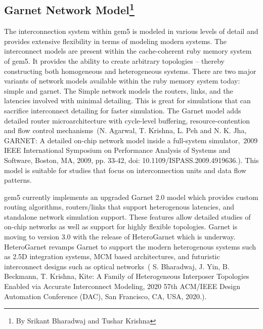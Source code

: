 \subsection[Garnet Network Model]{Garnet Network Model\footnote{By Srikant Bharadwaj and Tushar Krishna}}

The interconnection system within gem5 is modeled in various levels of detail and provides extensive
flexibility in terms of modeling modern systems.
The interconnect models are present within the cache-coherent ruby memory system of gem5.
It provides the ability to create arbitrary topologies – thereby constructing both homogeneous and heterogeneous systems.
There are two major variants of network models available within the ruby memory system today: simple and garnet.
The Simple network models the routers, links, and the latencies involved with minimal detailing.
This is great for simulations that can sacrifice interconnect detailing for faster simulation.
The Garnet model adds detailed router microarchitecture with cycle-level buffering, resource-contention and flow control mechanisms~\cite{}(N. Agarwal, T. Krishna, L. Peh and N. K. Jha, GARNET: A detailed on-chip network model inside a full-system simulator, 2009 IEEE International Symposium on Performance Analysis of Systems and Software, Boston, MA, 2009, pp. 33-42, doi: 10.1109/ISPASS.2009.4919636.).
This model is suitable for studies that focus on interconnection units and data flow patterns.

gem5 currently implements an upgraded Garnet 2.0 model which provides custom routing algorithms, routers/links that support heterogenous latencies, and standalone network simulation support.
These features allow detailed studies of on-chip networks as well as support for highly flexible topologies.
Garnet is moving to version 3.0 with the release of HeteroGarnet which is underway.
HeteroGarnet revamps Garnet to support the modern heterogenous systems such as 2.5D integration systems, MCM based architectures, and futuristic interconnect designs such as optical networks~\cite{}( S. Bharadwaj, J. Yin, B. Beckmann, T. Krishna, Kite: A Family of Heterogeneous Interposer Topologies Enabled via Accurate Interconnect Modeling, 2020 57th ACM/IEEE Design Automation Conference (DAC), San Francisco, CA, USA, 2020.).

